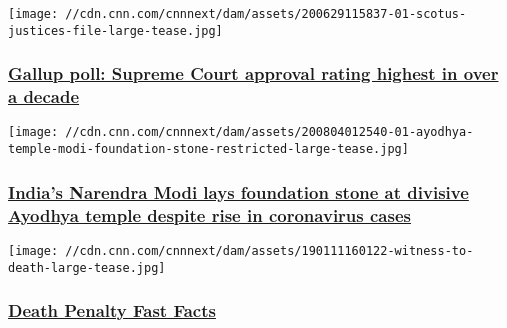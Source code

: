 \href{/2020/08/05/politics/supreme-court-approval-poll/index.html}{}

\texttt{[image: //cdn.cnn.com/cnnnext/dam/assets/200629115837-01-scotus-justices-file-large-tease.jpg]}

\hypertarget{gallup-poll-supreme-court-approval-rating-highest-in-over-a-decade}{%
\subsubsection{\texorpdfstring{\href{/2020/08/05/politics/supreme-court-approval-poll/index.html}{Gallup
poll: Supreme Court approval rating highest in over a
decade}}{Gallup poll: Supreme Court approval rating highest in over a decade}}\label{gallup-poll-supreme-court-approval-rating-highest-in-over-a-decade}}

\href{/2020/08/04/asia/ayodhya-temple-modi-foundation-stone-intl-hnk/index.html}{}

\texttt{[image: //cdn.cnn.com/cnnnext/dam/assets/200804012540-01-ayodhya-temple-modi-foundation-stone-restricted-large-tease.jpg]}

\hypertarget{indias-narendra-modi-lays-foundation-stone-at-divisive-ayodhya-temple-despite-rise-in-coronavirus-cases}{%
\subsubsection{\texorpdfstring{\href{/2020/08/04/asia/ayodhya-temple-modi-foundation-stone-intl-hnk/index.html}{India's
Narendra Modi lays foundation stone at divisive Ayodhya temple despite
rise in coronavirus
cases}}{India's Narendra Modi lays foundation stone at divisive Ayodhya temple despite rise in coronavirus cases}}\label{indias-narendra-modi-lays-foundation-stone-at-divisive-ayodhya-temple-despite-rise-in-coronavirus-cases}}

\href{/2013/07/19/us/death-penalty-fast-facts/index.html}{}

\texttt{[image: //cdn.cnn.com/cnnnext/dam/assets/190111160122-witness-to-death-large-tease.jpg]}

\hypertarget{death-penalty-fast-facts}{%
\subsubsection{\texorpdfstring{\href{/2013/07/19/us/death-penalty-fast-facts/index.html}{Death
Penalty Fast
Facts}}{Death Penalty Fast Facts}}\label{death-penalty-fast-facts}}

\href{/2013/02/19/us/stephen-breyer-fast-facts/index.html}{}

